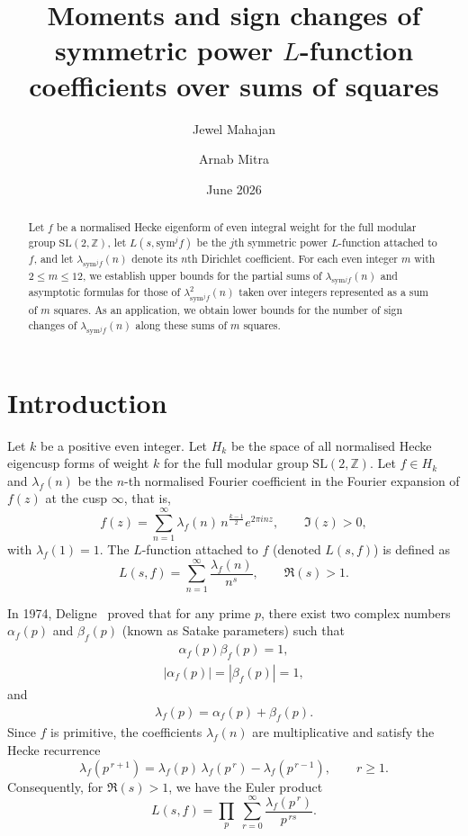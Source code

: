 \documentclass[10pt]{amsart}
\title{Moments and sign changes of symmetric power $L$-function coefficients over sums of squares}
\author{Jewel Mahajan}
\author{Arnab Mitra}
\date{June 2026}
\begin{document}
\begin{abstract}
Let $f$ be a normalised Hecke eigenform of even integral weight for the full modular group $\mathrm{SL}(2,\mathbb{Z})$, let $L(s,\mathrm{sym}^{j}f)$ be the $j$th symmetric power $L$-function attached to $f$, and let $\lambda_{\mathrm{sym}^{j}f}(n)$ denote its $n$th Dirichlet coefficient. For each even integer $m$ with $2 \le m \le 12$, we establish upper bounds for the partial sums of $\lambda_{\mathrm{sym}^{j}f}(n)$ and asymptotic formulas for those of $\lambda_{\mathrm{sym}^{j}f}^{2}(n)$ taken over integers represented as a sum of $m$ squares. As an application, we obtain lower bounds for the number of sign changes of $\lambda_{\mathrm{sym}^{j}f}(n)$ along these sums of $m$ squares.
\end{abstract}


\maketitle

\section{Introduction}

Let $k$ be a positive even integer. Let \( H_k \) be the space of all normalised Hecke eigencusp forms of weight $k$ for the full modular group \(\mathrm{SL}(2,\mathbb{Z})\). Let $f \in H_k $ and \( \lambda_{f}(n) \) be the \( n \)-th normalised Fourier coefficient in the Fourier expansion of \( f(z) \) at the cusp \( \infty \), that is,
\[
f(z)=\sum_{n=1}^{\infty}\lambda_{f}(n)\,n^{\frac{k-1}{2}}e^{2\pi i n z},
\qquad \Im(z)>0,
\]
with \(\lambda_{f}(1)=1\).
The \( L \)-function attached to \( f \) (denoted \( L(s,f) \)) is defined as
\[
L(s,f)=\sum_{n=1}^{\infty}\frac{\lambda_{f}(n)}{n^{s}},
\qquad \Re(s)>1.
\]

In 1974, Deligne~\cite{deligne1974} proved that for any prime \( p \), there exist two complex numbers \( \alpha_{f}(p) \) and \( \beta_{f}(p) \) (known as Satake parameters) such that
\begin{align}\label{eq:deligne1}
\alpha_{f}(p)\beta_{f}(p) = 1,  
\end{align}
\begin{align}\label{eq:deligne2}
|\alpha_{f}(p)| = |\beta_{f}(p)| = 1,  
\end{align}
and
\begin{align}\label{eq:deligne3}
\lambda_{f}(p)=\alpha_{f}(p)+\beta_{f}(p). 
\end{align}
Since \( f \) is primitive, the coefficients \( \lambda_f(n) \) are multiplicative and satisfy the Hecke recurrence
\begin{equation}\label{recurrence}
\lambda_f(p^{\,r+1})=\lambda_f(p)\,\lambda_f(p^{\,r})-\lambda_f(p^{\,r-1}),
\qquad r\ge 1.
\end{equation}
Consequently, for \( \Re(s)>1 \), we have the Euler product
\begin{equation}\label{eulerproduct}
L(s,f)=\prod_{p}\; \sum_{r=0}^{\infty}\frac{\lambda_f(p^{\,r})}{p^{\,rs}} .
\end{equation}
\end{document}
